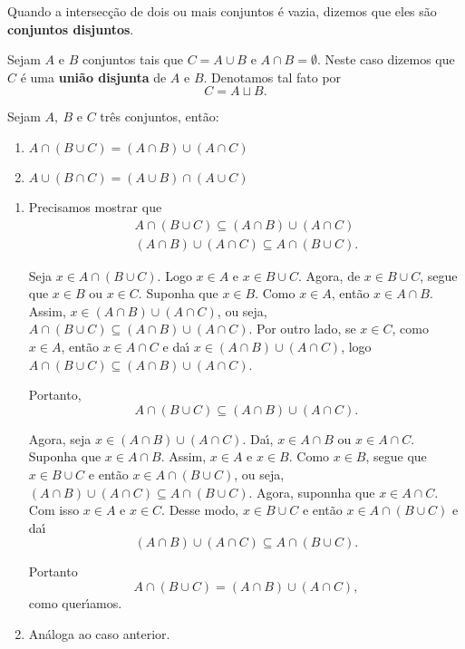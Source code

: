 Quando a intersec{\c c}{\~a}o de dois ou mais conjuntos {\'e} vazia, dizemos que eles s{\~a}o \textbf{conjuntos disjuntos}.

Sejam $A$ e $B$ conjuntos tais que $C = A \cup B$ e $A \cap B = \emptyset$. Neste caso dizemos que $C$ {\'e} uma \textbf{uni{\~a}o disjunta} de $A$ e $B$. Denotamos tal fato por
\[
C = A \sqcup B.
\]

\begin{proposicao} Sejam $A,\ B$ e $C$ tr{\^e}s conjuntos, ent{\~a}o:
\begin{enumerate}
\item $A\cap(B\cup C)=(A\cap B)\cup(A\cap C)$
\item $A\cup(B\cap C)=(A\cup B)\cap(A\cup C)$
\end{enumerate}
\end{proposicao}
\begin{prova}
	\begin{enumerate}
\item Precisamos mostrar que
\begin{align*}
A\cap(B\cup C)\subseteq(A\cap B)\cup(A\cap C)\\
(A\cap B)\cup(A\cap C)\subseteq A\cap(B\cup C).
\end{align*}

Seja $x\in A\cap(B\cup C)$. Logo $x\in A$ e $x\in B\cup C$. Agora, de $x\in B\cup C$, segue que $x\in B$ ou $x\in C$. Suponha que $x\in B$. Como $x\in A$, ent\~ao $x\in A\cap B$. Assim, $x\in(A\cap B)\cup(A\cap C)$, ou seja, $A\cap(B\cup C)\subseteq(A\cap B)\cup(A\cap C)$. Por outro lado, se $x\in C$, como $x\in A$, ent{\~a}o $x\in A\cap C$ e da{\'\i} $x\in(A\cap B)\cup(A\cap C)$, logo $A\cap(B\cup C)\subseteq(A\cap B)\cup(A\cap C)$.

Portanto,
\[
	A\cap(B\cup C)\subseteq(A\cap B)\cup(A\cap C).
\]

Agora, seja $x\in(A\cap B)\cup(A\cap C)$. Da{\'\i}, $x\in A\cap B$ ou $x\in A\cap C$. Suponha que $x\in A\cap B$. Assim, $x\in A$ e $x\in B$. Como $x\in B$, segue que $x\in B\cup C$ e ent{\~a}o $x\in A\cap(B\cup C)$, ou seja, $(A\cap B)\cup(A\cap C)\subseteq A\cap(B\cup C)$. Agora, suponnha que $x\in A\cap C$. Com isso $x\in A$ e $x\in C$. Desse modo, $x\in B\cup C$ e ent{\~a}o $x\in A\cap(B\cup C)$ e da{\'\i}
\[
	(A\cap B)\cup(A\cap C)\subseteq A\cap(B\cup C).
\]

Portanto
\[
	A\cap(B\cup C)=(A\cap B)\cup(A\cap C),
\]
como quer{\'\i}amos.
\item An\'aloga ao caso anterior.
\end{enumerate}
\end{prova}

